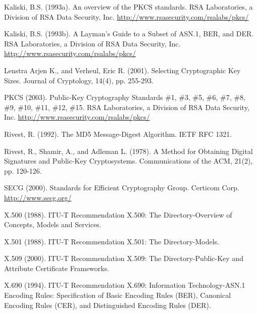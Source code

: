 \documentclass{article}
\begin{document}
Kaliski, B.S. (1993a). An overview of the PKCS standards. RSA Laboratories,
a Division of RSA Data Security, Inc.
\url{http://www.rsasecurity.com/rsalabs/pkcs/}

Kaliski, B.S. (1993b). 
A Layman's Guide to a Subset of ASN.1, BER, and DER.
RSA Laboratories,
a Division of RSA Data Security, Inc.
\url{http://www.rsasecurity.com/rsalabs/pkcs/}

Lenstra Arjen K., and Verheul,  Eric R. (2001).
Selecting Cryptographic Key Sizes.
Journal of Cryptology, 14(4), pp. 255-293.

PKCS (2003). Public-Key Cryptography Standards \#1, \#3, \#5,
\#6, \#7, \#8, \#9, \#10, \#11, \#12, \#15. RSA Laboratories,
a Division of RSA Data Security, Inc.
\url{http://www.rsasecurity.com/rsalabs/pkcs/}

Rivest, R. (1992). The MD5 Message-Digest Algorithm. 
IETF RFC 1321.

Rivest, R., Shamir, A., and Adleman L. (1978). A Method for Obtaining 
Digital Signatures and Public-Key Cryptosystems. Communications of 
the ACM, 21(2), pp. 120-126.

SECG (2000). Standards for Efficient Cryptography Group. Certicom Corp.
\url{http://www.secg.org/}

X.500 (1988). ITU-T Recommendation X.500: The Directory-Overview of 
Concepts, Models and Services.

X.501 (1988). ITU-T Recommendation X.501: The Directory-Models. 

X.509 (2000). ITU-T Recommendation X.509:
The Directory-Public-Key and Attribute Certificate Frameworks. 

X.690 (1994). ITU-T Recommendation X.690:
Information Technology-ASN.1 Encoding Rules: Specification of 
Basic Encoding Rules (BER), Canonical Encoding Rules (CER), 
and Distinguished Encoding Rules (DER).
\end{document}
